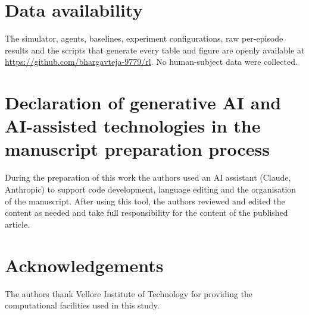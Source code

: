 \documentclass[review,12pt]{elsarticle}
\begin{document}
\section*{Data availability}
The simulator, agents, baselines, experiment configurations, raw per-episode results and the scripts that generate every table and figure are openly available at \url{https://github.com/bhargavteja-9779/rl}. No human-subject data were collected.

\section*{Declaration of generative AI and AI-assisted technologies in the manuscript preparation process}
During the preparation of this work the authors used an AI assistant (Claude, Anthropic) to support code development, language editing and the organisation of the manuscript. After using this tool, the authors reviewed and edited the content as needed and take full responsibility for the content of the published article.

\section*{Acknowledgements}
The authors thank Vellore Institute of Technology for providing the computational facilities used in this study.



\end{document}
